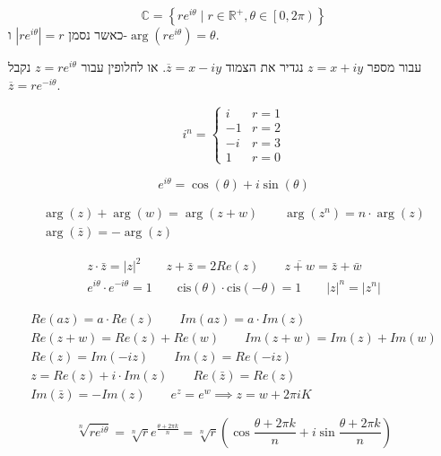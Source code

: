 \documentclass{tstextbook}
\begin{document}
\begin{proposition}
$$\mathbb{C}=\left\{  re^{i\theta}\mid r\in \mathbb{R}^+,\theta \in\left[ 0,2\pi \right)  \right\}$$
כאשר נסמן \(\left\lvert  re^{i\theta}  \right\rvert=r\) ו-\(\arg\left( re^{i\theta} \right)=\theta\).

\end{proposition}
\begin{definition}
עבור מספר \(z=x+iy\) נגדיר את הצמוד \(\overline{z}=x-iy\). או לחלופין עבור \(z=re^{i\theta}\) נקבל \(\overline{z}=re^{-i\theta}\).

\end{definition}
\begin{proposition}[חזקות של i]
$$i^n=\begin{cases}i & r=1 \\-1 &r=2 \\-i & r=3\\1 & r=0\end{cases}
$$

\end{proposition}
\begin{proposition}
$$e^{i\theta}=\cos \left( \theta \right)+i\sin \left( \theta \right)$$

\end{proposition}
\begin{proposition}
$$\begin{gather}\arg(z)+\arg(w)=\arg(z+w)\qquad \arg(z^n)= n \cdot \arg(z)  \\\arg(\bar z)= - \arg (z)\end{gather}
$$

\end{proposition}
\begin{proposition}
$$\begin{gather}z\cdot \bar z = |z|^2 \qquad z + \bar z = 2Re(z) \qquad \overline{z+w}=\bar z +\bar w  \\e^{i\theta}\cdot e^{-i\theta}=1\qquad \text{cis}(\theta)\cdot \text{cis}(-\theta)=1 \qquad |z|^n = |z^n|\end{gather}
$$

\end{proposition}
\begin{proposition}
$$\begin{gather}Re(az)=a\cdot Re(z)\qquad Im(az)=a\cdot Im(z) \\ Re(z+w)=Re(z)+Re(w) \qquad Im(z+w)= Im(z)+Im(w) \\ Re(z)=Im(-iz)\qquad Im(z)=Re(-iz) \\ z= Re(z)+i\cdot Im(z)\qquad Re(\bar z)=Re(z) \\Im(\bar z)=-Im(z)\qquad e^z = e^w\implies z=w+2\pi i K\end{gather}
$$

\end{proposition}
\begin{proposition}
$$\sqrt[n]{re^{i\theta}}= \sqrt[n]{r} e^{\frac{\theta+2\pi k}{n}}= \sqrt[n]{r}\left(\cos\frac{\theta+2\pi k}{n}+i\sin \frac{\theta+2\pi k}{n}\right)
$$

\end{proposition}
\end{document}
